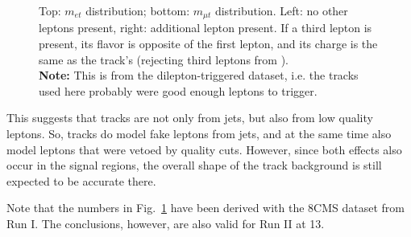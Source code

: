 \begin{figure}
\begin{center}
	\caption{Top: $m_{et}$ distribution; bottom: $m_{\mu t}$ distribution. Left: no other leptons present, right: additional lepton present. If a third lepton is present, its flavor is opposite of the first lepton, and its charge is the same as the track's (rejecting third leptons from \Z).\\
	\textbf{Note:} This is from the dilepton-triggered dataset, i.e. the tracks used here probably were good enough leptons to trigger.
	\label{fig:app:MOSSFlepton,track}}
\end{center}
\end{figure}

This suggests that tracks are not only from jets, but also from low quality leptons. So, tracks do model fake leptons from jets, and at the same time also model leptons that were vetoed by quality cuts. However, since both effects also occur in the signal regions, the overall shape of the track background is still expected to be accurate there.

Note that the numbers in Fig.~\ref{fig:app:MOSSFlepton,track} have been derived with the 8\TeV CMS dataset from Run I. The conclusions, however, are also valid for Run II at 13\TeV.
